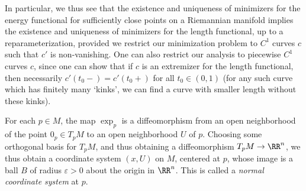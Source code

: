 In particular, we thus see that the existence and uniqueness of minimizers for the energy functional for sufficiently close points on a Riemannian manifold implies the existence and uniqueness of minimizers for the length functional, up to a reparameterization, provided we restrict our minimization problem to $C^1$ curves $c$ such that $c'$ is non-vanishing. One can also restrict our analysis to piecewise $C^1$ curves $c$, since one can show that if $c$ is an extremizer for the length functional, then necessarily $c'(t_0-) = c'(t_0+)$ for all $t_0 \in (0,1)$ (for any such curve which has finitely many `kinks', we can find a curve with smaller length without these kinks).

%
%


%

For each $p \in M$, the map $\exp_p$ is a diffeomorphism from an open neighborhood of the point $0_p \in T_p M$ to an open neighborhood $U$ of $p$. Choosing some orthogonal basis for $T_p M$, and thus obtaining a diffeomorphism $T_p M \to \RR^n$, we thus obtain a coordinate system $(x,U)$ on $M$, centered at $p$, whose image is a ball $B$ of radius $\varepsilon > 0$ about the origin in $\RR^n$. This is called a \emph{normal coordinate system} at $p$.

